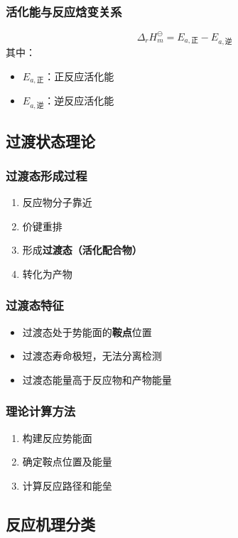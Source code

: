 \subsubsection{活化能与反应焓变关系}
\[
\Delta_r H_m^\ominus = E_{a,\text{正}} - E_{a,\text{逆}}
\]
其中：
\begin{itemize}
\item $E_{a,\text{正}}$：正反应活化能
\item $E_{a,\text{逆}}$：逆反应活化能
\end{itemize}

\subsection{过渡状态理论}
\subsubsection{过渡态形成过程}

\begin{enumerate}
\item 反应物分子靠近
\item 价键重排
\item 形成\textbf{过渡态（活化配合物）}
\item 转化为产物
\end{enumerate}

\subsubsection{过渡态特征}
\begin{itemize}
\item 过渡态处于势能面的\textbf{鞍点}位置
\item 过渡态寿命极短，无法分离检测
\item 过渡态能量高于反应物和产物能量
\end{itemize}

\subsubsection{理论计算方法}
\begin{enumerate}
\item 构建反应势能面
\item 确定鞍点位置及能量
\item 计算反应路径和能垒
\end{enumerate}

\subsection{反应机理分类}
